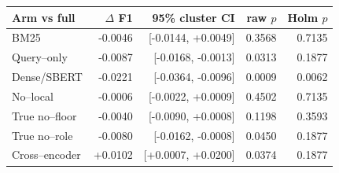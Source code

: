 \begin{tabular}{lrrrr}
\toprule
Arm vs full & $\Delta$ F1 & 95\% cluster CI & raw $p$ & Holm $p$ \\
\midrule
BM25 & -0.0046 & [-0.0144, +0.0049] & 0.3568 & 0.7135 \\
Query--only & -0.0087 & [-0.0168, -0.0013] & 0.0313 & 0.1877 \\
Dense/SBERT & -0.0221 & [-0.0364, -0.0096] & 0.0009 & 0.0062 \\
No--local & -0.0006 & [-0.0022, +0.0009] & 0.4502 & 0.7135 \\
True no--floor & -0.0040 & [-0.0090, +0.0008] & 0.1198 & 0.3593 \\
True no--role & -0.0080 & [-0.0162, -0.0008] & 0.0450 & 0.1877 \\
Cross--encoder & +0.0102 & [+0.0007, +0.0200] & 0.0374 & 0.1877 \\
\bottomrule
\end{tabular}
